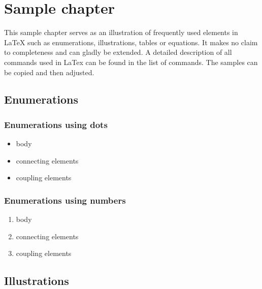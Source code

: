 \chapter{Sample chapter}
\label{cha:samplechapter}
This sample chapter serves as an illustration of frequently used elements in LaTeX such as enumerations, illustrations, tables or equations. It makes no claim to completeness and can gladly be extended. A detailed description of all commands used in LaTex can be found in the list of commands.
The samples can be copied and then adjusted.  
\section{Enumerations}
\label{sec:enumerations}

\subsection{Enumerations using dots}
\label{enumeration_dots}

\begin{itemize}
	\item body
	\item connecting elements
	\item coupling elements
\end{itemize}

\subsection{Enumerations using numbers}
\label{enumeration_numbers}

\begin{enumerate}
	\item body
	\item connecting elements
	\item coupling elements
\end{enumerate}

\cleardoublepage
\section{Illustrations}
\label{sec:illustrations}

